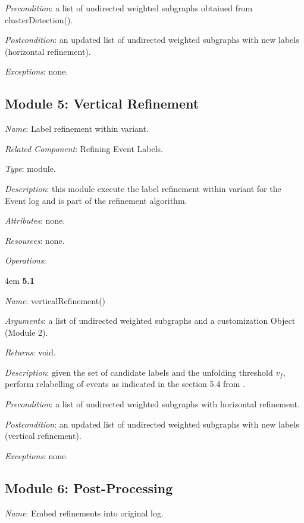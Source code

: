 \documentclass[notitlepage]{article}
\begin{document}
\begin{flushleft}
\textit{Precondition}: a list of undirected weighted subgraphs obtained from clusterDetection().

\textit{Postcondition}: an updated list of undirected weighted subgraphs with new labels (horizontal refinement).

\textit{Exceptions}: none.
\par
\endgroup

\subsection{Module 5: Vertical Refinement}
\textit{Name}: Label refinement within variant.

\textit{Related Component}: Refining Event Labels.

\textit{Type}: module.

\textit{Description}: this module execute the label refinement within variant for the Event log and is part of the refinement algorithm.

\textit{Attributes}: none.

\textit{Resources}: none.

\textit{Operations}: 
\medskip

\par
\begingroup
\leftskip4em
\textbf{5.1} 

\textit{Name}: verticalRefinement()

\textit{Arguments}: a list of undirected weighted subgraphs and a customization Object (Module 2).

\textit{Returns}: void.

\textit{Description}: given the set of candidate labels and the unfolding threshold $v_f$, perform relabelling of events as indicated in the section 5.4 from \cite{paper}.

\textit{Precondition}: a list of undirected weighted subgraphs with horizontal refinement.

\textit{Postcondition}: an updated list of undirected weighted subgraphs with new labels (vertical refinement).

\textit{Exceptions}: none.
\par
\endgroup




\subsection{Module 6: Post-Processing}
\textit{Name}: Embed refinements into original log.


\end{flushleft}
\end{document}
